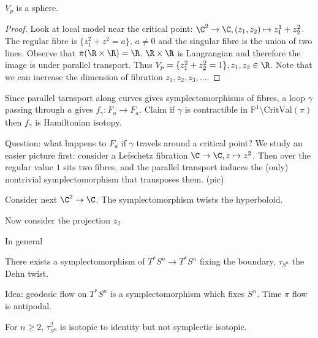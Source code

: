 \documentclass[a4paper]{article}
\renewcommand*{\P}{\mathbb{P}}
\begin{document}
\begin{proposition}
  \(V_p\) is a sphere.
\end{proposition}

\begin{proof}
  Look at local model near the critical point: \(\C^2 \to \C, (z_1, z_2) \mapsto z_1^1 + z_2^2\). The regular fibre is \(\{z_1^2 + z^2 = a\}\), \(a \ne 0\) and the singular fibre is the union of two lines. Observe that \(\pi(\R \times \R) = \R\). \(\R \times \R\) is Langrangian and therefore the image is under parallel transport. Thus \(V_p = \{z_1^2 + z_2^2 = 1\}, z_1, z_2 \in \R\). Note that we can increase the dimension of fibration \(z_1, z_2, z_3, \dots\).
\end{proof}

Since parallel tarnsport along curves gives symplectomorphisms of fibres, a loop \(\gamma\) passing through \(a\) gives \(f_\gamma: F_a \to F_a\). Claim if \(\gamma\) is contractible in \(\P^1 \setminus \mathrm{CritVal}(\pi)\) then \(f_\gamma\) is Hamiltonian isotopy.

Question: what happens to \(F_a\) if \(\gamma\) travels around a critical point? We study an easier picture first: consider a Lefschetz fibration \(\C \to \C, z \mapsto z^2\). Then over the regular value \(1\) sits two fibres, and the parallel transport induces the (only) nontrivial symplectomorphism that transposes them. (pic)

Consider next \(\C^2 \to \C\). The symplectomorphism twists the hyperboloid.

Now consider the projection \(z_2\)

In general

\begin{theorem}
  There exists a symplectomorphism of \(T^*S^n \to T^*S^n\) fixing the boundary, \(\tau_{S^n}\) the Dehn twist.
\end{theorem}

Idea: geodesic flow on \(T^*S^n\) is a symplectomorphism which fixes \(S^n\). Time \(\pi\) flow is antipodal.

For \(n \geq 2\), \(\tau_{S^n}^2\) is isotopic to identity but not symplectic isotopic.



\printindex
\end{document}
